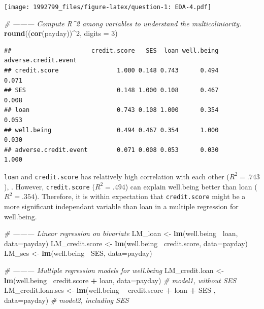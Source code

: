 \documentclass[]{article}
\newenvironment{Shaded}{\begin{snugshade}}{\end{snugshade}}
\newcommand{\CommentTok}[1]{\textcolor[rgb]{0.56,0.35,0.01}{\textit{#1}}}
\newcommand{\DataTypeTok}[1]{\textcolor[rgb]{0.13,0.29,0.53}{#1}}
\newcommand{\DecValTok}[1]{\textcolor[rgb]{0.00,0.00,0.81}{#1}}
\newcommand{\KeywordTok}[1]{\textcolor[rgb]{0.13,0.29,0.53}{\textbf{#1}}}
\newcommand{\NormalTok}[1]{#1}
\newcommand{\OperatorTok}[1]{\textcolor[rgb]{0.81,0.36,0.00}{\textbf{#1}}}
\newcommand{\StringTok}[1]{\textcolor[rgb]{0.31,0.60,0.02}{#1}}
\begin{document}
\texttt{[image: 1992799\_files/figure-latex/question-1: EDA-4.pdf]}

\begin{Shaded}
\begin{Highlighting}[]
\CommentTok{#  --------- Compute R^2 among variables to understand the multicoliniarity.}
\KeywordTok{round}\NormalTok{((}\KeywordTok{cor}\NormalTok{(payday))}\OperatorTok{^}\DecValTok{2}\NormalTok{, }\DataTypeTok{digits =} \DecValTok{3}\NormalTok{)}
\end{Highlighting}
\end{Shaded}

\begin{verbatim}
##                      credit.score   SES  loan well.being adverse.credit.event
## credit.score                1.000 0.148 0.743      0.494                0.071
## SES                         0.148 1.000 0.108      0.467                0.008
## loan                        0.743 0.108 1.000      0.354                0.053
## well.being                  0.494 0.467 0.354      1.000                0.030
## adverse.credit.event        0.071 0.008 0.053      0.030                1.000
\end{verbatim}

\texttt{loan} and \texttt{credit.score} has relatively high correlation
with each other (\(R^2 = .743\)), . However, \texttt{credit.score}
(\(R^2 = .494\)) can explain well.being better than loan
(\(R^2 = .354\)). Therefore, it is within expectation that
\texttt{credit.score} might be a more significant independant variable
than loan in a multiple regression for well.being.

\begin{Shaded}
\begin{Highlighting}[]
\CommentTok{# --------- Linear regression on bivariate}
\NormalTok{LM_loan <-}\StringTok{ }\KeywordTok{lm}\NormalTok{(well.being}\OperatorTok{~}\StringTok{ }\NormalTok{loan, }\DataTypeTok{data=}\NormalTok{payday)}
\NormalTok{LM_credit.score <-}\StringTok{ }\KeywordTok{lm}\NormalTok{(well.being}\OperatorTok{~}\StringTok{ }\NormalTok{credit.score, }\DataTypeTok{data=}\NormalTok{payday) }
\NormalTok{LM_ses <-}\StringTok{ }\KeywordTok{lm}\NormalTok{(well.being}\OperatorTok{~}\StringTok{ }\NormalTok{SES, }\DataTypeTok{data=}\NormalTok{payday) }

\CommentTok{# --------- Multiple regression models for well.being}
\NormalTok{LM_credit.loan <-}\StringTok{ }\KeywordTok{lm}\NormalTok{(well.being}\OperatorTok{~}\StringTok{ }\NormalTok{credit.score }\OperatorTok{+}\StringTok{ }\NormalTok{loan, }\DataTypeTok{data=}\NormalTok{payday) }\CommentTok{# model1, without SES }
\NormalTok{LM_credit.loan.ses <-}\StringTok{ }\KeywordTok{lm}\NormalTok{(well.being }\OperatorTok{~}\StringTok{ }\NormalTok{credit.score }\OperatorTok{+}\StringTok{ }\NormalTok{loan }\OperatorTok{+}\StringTok{ }\NormalTok{SES , }\DataTypeTok{data=}\NormalTok{payday)  }\CommentTok{# model2, including SES}
\end{Highlighting}
\end{Shaded}
\end{document}
